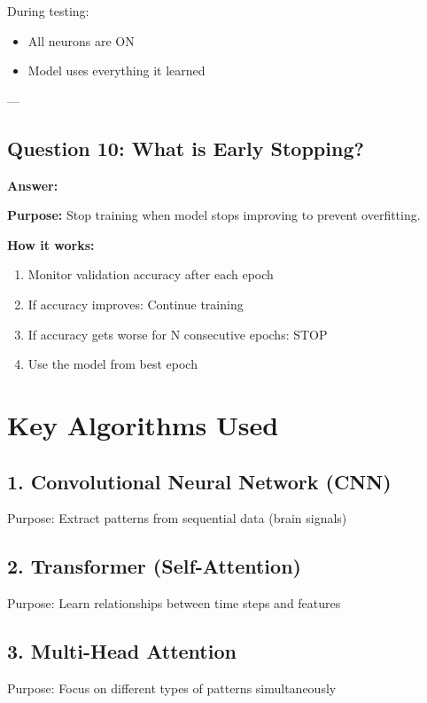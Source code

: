 \documentclass[12pt,a4paper]{article}
\begin{document}
During testing:
\begin{itemize}
    \item All neurons are ON
    \item Model uses everything it learned
\end{itemize}

---

\subsection{Question 10: What is Early Stopping?}

\textbf{Answer:}

\textbf{Purpose:} Stop training when model stops improving to prevent overfitting.

\textbf{How it works:}

\begin{enumerate}
    \item Monitor validation accuracy after each epoch
    \item If accuracy improves: Continue training
    \item If accuracy gets worse for N consecutive epochs: STOP
    \item Use the model from best epoch
\end{enumerate}

\section{Key Algorithms Used}

\subsection{1. Convolutional Neural Network (CNN)}
Purpose: Extract patterns from sequential data (brain signals)

\subsection{2. Transformer (Self-Attention)}
Purpose: Learn relationships between time steps and features

\subsection{3. Multi-Head Attention}
Purpose: Focus on different types of patterns simultaneously
\end{document}
